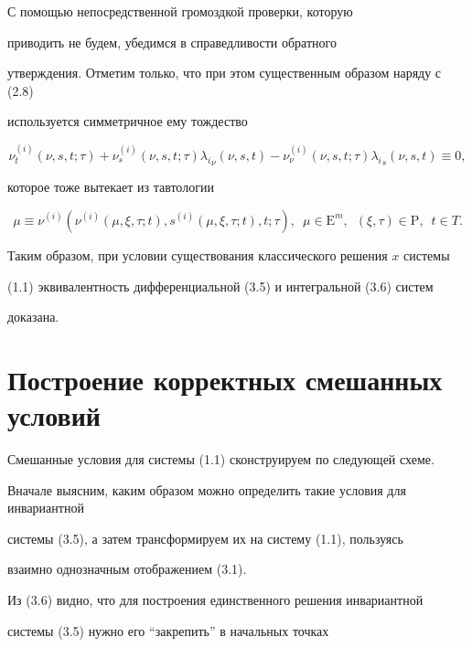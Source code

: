 С помощью непосредственной громоздкой проверки, которую


приводить не будем, убедимся в справедливости обратного 


утверждения. Отметим только, что при этом существенным образом наряду с (2.8)


используется симметричное ему тождество


$$


\nu^{(i)}_t (\nu,s,t;\tau)+\nu^{(i)}_s (\nu,s,t;\tau) 


{\lambda_i}_\nu (\nu,s,t) - \nu^{(i)}_\nu (\nu,s,t;\tau) 


{\lambda_i}_s (\nu,s,t) \equiv 0,


$$


которое тоже вытекает из тавтологии 


$$


\mu \equiv \nu^{(i)}(\nu^{(i)}(\mu,\xi,\tau;t), 


s^{(i)} (\mu,\xi,\tau;t),t;\tau),\ \; \mu \in {\mathrm E}^m, 


\ \; (\xi,\tau) \in {\mathrm P},\ \; t \in T.


$$


Таким образом, при условии существования классического решения $x$ системы


(1.1) эквивалентность дифференциальной (3.5) и интегральной (3.6) систем 


доказана.





\section{Построение корректных смешанных условий}





Смешанные условия для системы (1.1) сконструируем по следующей схеме.


Вначале выясним, каким образом можно определить такие условия для инвариантной


системы (3.5), а затем трансформируем их на систему (1.1), пользуясь 


взаимно однозначным отображением (3.1).





Из (3.6) видно, что для построения единственного решения инвариантной 


системы (3.5) нужно его ``закрепить'' в начальных точках 


